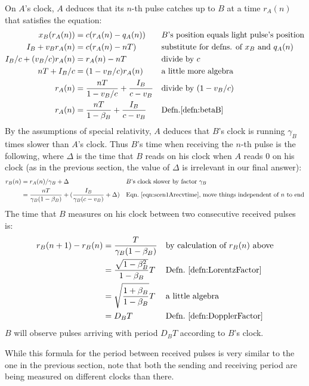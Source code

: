 \documentclass[a4paper]{article}
\theoremstyle{plain}
\theoremstyle{definition}
\begin{document}
On $A$'s clock, $A$ deduces that
its $n$-th pulse catches up to $B$ at a time $r_A(n)$ that satisfies the equation:
\begin{align}
x_B(r_A(n)) & = c(r_A(n) - q_A(n)) & & \text{$B$'s position equals light pulse's position} \nonumber \\
I_B + v_B r_A(n) & = c(r_A(n) - nT) & & \text{substitute for defns. of $x_B$ and $q_A(n)$} \\
I_B/c + (v_B/c) r_A(n) & = r_A(n) - nT & & \text{divide by $c$} \nonumber \\
nT + I_B/c & = (1 - v_B/c) r_A(n) & & \text{a little more algebra} \nonumber \\
r_A(n) & = \frac{nT}{1 - v_B/c} + \frac{I_B}{c-v_B} & & \text{divide by $(1-v_B/c)$} \nonumber \\
r_A(n) & = \frac{nT}{1 - \beta_B} + \frac{I_B}{c-v_B} & & \text{Defn.\eqref{defn:betaB}} \label{eqn:scen1Arecvtime}
\end{align}
By the assumptions of special relativity, $A$ deduces that $B$'s clock
is running $\gamma_B$ times slower than $A$'s clock.
Thus $B$'s time when receiving the $n$-th pulse is
the following, where $\Delta$ is the time that $B$ reads on his clock
when $A$ reads 0 on his clock (as in the previous section,
the value of $\Delta$ is irrelevant in our final answer):
\begin{align*}
r_B(n) & = r_A(n) / \gamma_B + \Delta & & \text{$B$'s clock slower by factor $\gamma_B$} \\
       & = \frac{nT}{\gamma_B(1 - \beta_B)} + (\frac{I_B}{\gamma_B(c-v_B)} + \Delta) & & \text{Eqn.~\eqref{eqn:scen1Arecvtime}, move things independent of $n$ to end}
\end{align*}
The time that $B$ measures on his clock between two consecutive received
pulses is:
\begin{align*}
r_B(n+1) - r_B(n)
  & = \frac{T}{\gamma_B(1 - \beta_B)} & & \text{by calculation of $r_B(n)$ above} \\
  & = \frac{\sqrt{1 - \beta_B^2}}{1 - \beta_B} T & & \text{Defn.~\eqref{defn:LorentzFactor}} \\
  & = \sqrt{ \frac{1 + \beta_B}{1 - \beta_B} } T & & \text{a little algebra} \\
  & = D_B T & & \text{Defn.~\eqref{defn:DopplerFactor}}
\end{align*}
$B$ will observe pulses arriving with period $D_B T$ according to
$B$'s clock.

While this formula for the period between received pulses
is very similar to the one in the previous section, note that
both the sending and receiving period are being measured on different
clocks than there.
\end{document}
